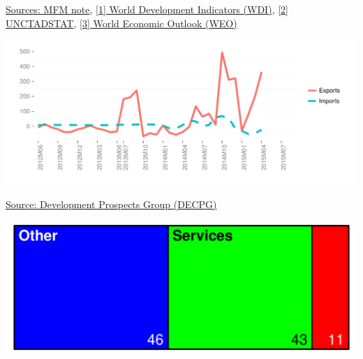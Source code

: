 \documentclass{article}\usepackage[]{graphicx}\usepackage[]{color}
\makeatletter
\def\maxwidth{ %
  \ifdim\Gin@nat@width>\linewidth
    \linewidth
  \else
    \Gin@nat@width
  \fi
}
\makeatother
\begin{document}
\begin{minipage}[b]{0.99\textwidth}
\begin{minipage}[t]{0.99\textwidth}
\raggedright{\footnotesize{\href{http://www.worldbank.org/en/topic/macroeconomics/overview}{Sources: MFM note}{,} \href{http://data.worldbank.org/data-catalog/world-development indicators}{[1] World Development Indicators (WDI)}{,} \href{http://unctadstat.unctad.org/wds/ReportFolders/reportFolders.aspx}{[2] UNCTADSTAT}{,} \href{https://www.imf.org/external/pubs/ft/weo/2015/02/weodata/index.aspx}{[3] World Economic Outlook (WEO)}}}
   \end{minipage} 
  \begin{minipage}[b]{\textwidth} %
  \vspace{+3ex}
    \begin{minipage}[c]{0.49\textwidth} %


{\centering \includegraphics[width=\maxwidth]{figure/ExpImp_HF-1} 

}



    \vspace*{-0.3cm}
    \raggedright{\footnotesize{\href{http://web.worldbank.org/WBSITE/EXTERNAL/EXTDEC/EXTDECPROSPECTS/0,,menuPK:476941~pagePK:51084723~piPK:51084722~theSitePK:476883,00.html}{Source: Development Prospects Group (DECPG)}}}
    \end{minipage}
    \begin{minipage}[c]{0.49\textwidth} %


{\centering \includegraphics[width=\maxwidth]{figure/GVA_Treemap-1} 

}
\end{minipage}
\end{minipage}
\end{minipage}
\end{document}
